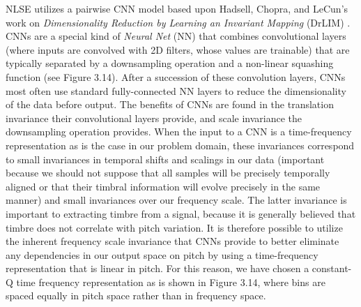 \documentclass[a4paper,12pt]{report} 	%
\numberwithin{figure}{chapter}
\numberwithin{table}{chapter}
\numberwithin{equation}{chapter}
\begin{document}
\begin{flushleft}
NLSE utilizes a pairwise CNN model based upon Hadsell, Chopra, and LeCun's work on \emph{Dimensionality Reduction by Learning an Invariant Mapping} (DrLIM) \cite{hadsell2006dimensionality}. CNNs are a special kind of \emph{Neural Net} (NN) that combines convolutional layers (where inputs are convolved with 2D filters, whose values are trainable) that are typically separated by a downsampling operation and a non-linear squashing function (see Figure 3.14). After a succession of these convolution layers, CNNs most often use standard fully-connected NN layers to reduce the dimensionality of the data before output. The benefits of CNNs are found in the translation invariance their convolutional layers provide, and scale invariance the downsampling operation provides. When the input to a CNN is a time-frequency representation as is the case in our problem domain, these invariances correspond to small invariances in temporal shifts and scalings in our data (important because we should not suppose that all samples will be precisely temporally aligned or that their timbral information will evolve precisely in the same manner) and small invariances over our frequency scale. The latter invariance is important to extracting timbre from a signal, because it is generally believed that timbre does not correlate with pitch variation. It is therefore possible to utilize the inherent frequency scale invariance that CNNs provide to better eliminate any dependencies in our output space on pitch by using a time-frequency representation that is linear in pitch. For this reason, we have chosen a constant-Q time frequency representation as is shown in Figure 3.14, where bins are spaced equally in pitch space rather than in frequency space.


\end{flushleft}
\end{document}

